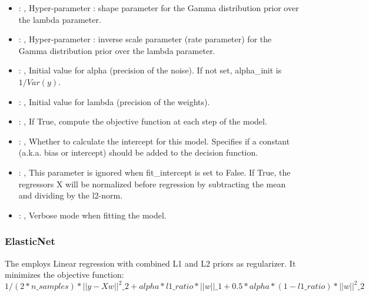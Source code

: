 \begin{itemize}
    \item {}: , 
      Hyper-parameter : shape parameter for the Gamma distribution
      prior over the lambda parameter.

    \item {}: , 
      Hyper-parameter : inverse scale parameter (rate parameter) for
      the Gamma distribution prior over the lambda parameter.

    \item {}: , 
      Initial value for alpha (precision of the noise).
      If not set, alpha\_init is $1/Var(y)$.

    \item {}: , 
      Initial value for lambda (precision of the weights).

    \item {}: , 
      If True, compute the objective function at each step of the
      model.

    \item {}: , 
      Whether to calculate the intercept for this model. Specifies if a constant (a.k.a. bias or
      intercept)                                                   should be added to the decision
      function.

    \item {}: , 
      This parameter is ignored when fit\_intercept is set to False. If True,
      the regressors X will be normalized before regression by subtracting the mean and
      dividing by the l2-norm.

    \item {}: , 
      Verbose mode when fitting the model.
  \end{itemize}


\subsubsection{ElasticNet}
  The  employs                         Linear regression with combined L1 and L2
  priors as regularizer.                         It minimizes the objective function:
  \begin{equation}                         1/(2*n\_{samples}) *||y - Xw||^2\_2+alpha*l1\_ratio*||w||\_1
  + 0.5 *alpha*(1 - l1\_ratio)*||w||^2\_2                         \end{equation}

